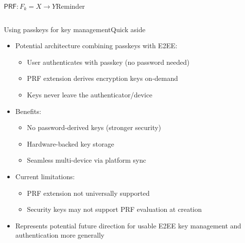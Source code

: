 \documentclass[aspectratio=169, lualatex, handout]{beamer}
\begin{document}
\begin{frame}{$\mathsf{PRF}: F_{k}= X \rightarrow Y$}{Reminder}
\begin{columns}[c]
\begin{column}{0.8\textwidth}
		\end{column}
	\end{columns}
\end{frame}

\begin{frame}{Using passkeys for key management}{Quick aside}
	\begin{itemize}
		\item Potential architecture combining passkeys with E2EE:
		      \begin{itemize}
			      \item User authenticates with passkey (no password needed)
			      \item PRF extension derives encryption keys on-demand
			      \item Keys never leave the authenticator/device
		      \end{itemize}
		\item Benefits:
		      \begin{itemize}
			      \item No password-derived keys (stronger security)
			      \item Hardware-backed key storage
			      \item Seamless multi-device via platform sync
		      \end{itemize}
		\item Current limitations:
		      \begin{itemize}
			      \item PRF extension not universally supported
			      \item Security keys may not support PRF evaluation at creation
		      \end{itemize}
		\item Represents potential future direction for usable E2EE key management and authentication more generally
	\end{itemize}
\end{frame}
\end{document}
